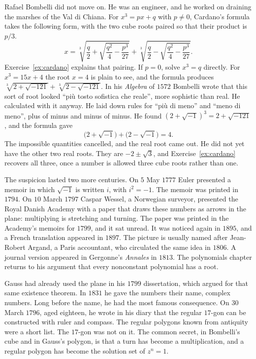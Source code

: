 Rafael Bombelli did not move on. He was an engineer, and he worked on draining the marshes of the Val di Chiana. For $x^3=px+q$ with $p\ne0$, Cardano's formula takes the following form, with the two cube roots paired so that their product is $p/3$.
\[
x=\sqrt[3]{\frac q2+\sqrt{\frac{q^2}4-\frac{p^3}{27}}}+\sqrt[3]{\frac q2-\sqrt{\frac{q^2}4-\frac{p^3}{27}}}.
\]
Exercise~\ref{ex:cardano} explains that pairing. If $p=0$, solve $x^3=q$ directly. For $x^3=15x+4$ the root $x=4$ is plain to see, and the formula produces $\sqrt[3]{2+\sqrt{-121}}+\sqrt[3]{2-\sqrt{-121}}$. In his \emph{Algebra} of $1572$ Bombelli wrote that this sort of root looked ``pi\`u tosto sofistica che reale'', more sophistic than real. He calculated with it anyway. He laid down rules for ``pi\`u di meno'' and ``meno di meno'', plus of minus and minus of minus. He found $(2+\sqrt{-1})^3=2+\sqrt{-121}$, and the formula gave
\[
\bigl(2+\sqrt{-1}\bigr)+\bigl(2-\sqrt{-1}\bigr)=4.
\]
The impossible quantities cancelled, and the real root came out. He did not yet have the other two real roots. They are $-2\pm\sqrt3$, and Exercise~\ref{ex:cardano} recovers all three, once a number is allowed three cube roots rather than one.

The suspicion lasted two more centuries. On $5$ May $1777$ Euler presented a memoir in which $\sqrt{-1}$ is written $i$, with $i^2=-1$. The memoir was printed in $1794$. On $10$ March $1797$ Caspar Wessel, a Norwegian surveyor, presented the Royal Danish Academy with a paper that draws these numbers as arrows in the plane: multiplying is stretching and turning. The paper was printed in the Academy's memoirs for $1799$, and it sat unread. It was noticed again in $1895$, and a French translation appeared in $1897$. The picture is usually named after Jean-Robert Argand, a Paris accountant, who circulated the same idea in $1806$. A journal version appeared in Gergonne's \emph{Annales} in $1813$. The polynomials chapter returns to his argument that every nonconstant polynomial has a root.

Gauss had already used the plane in his $1799$ dissertation, which argued for that same existence theorem. In $1831$ he gave the numbers their name, complex numbers. Long before the name, he had the most famous consequence. On $30$ March $1796$, aged eighteen, he wrote in his diary that the regular $17$-gon can be constructed with ruler and compass. The regular polygons known from antiquity were a short list. The $17$-gon was not on it. The common secret, in Bombelli's cube and in Gauss's polygon, is that a turn has become a multiplication, and a regular polygon has become the solution set of $z^n=1$.

